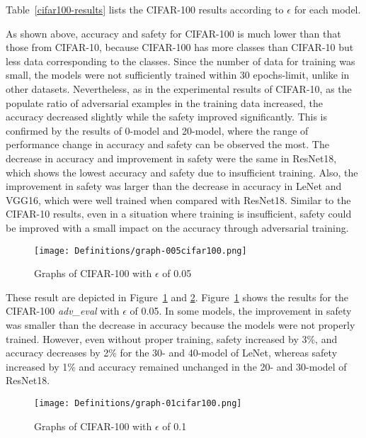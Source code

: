 \documentclass[symmetry,article,submit,moreauthors,pdftex]{Definitions/mdpi}
\begin{document}
Table~\ref{cifar100-results} lists the CIFAR-100 results according to \begin{math}\epsilon\end{math} for each model.

As shown above, accuracy and safety for CIFAR-100 is much lower than that those from CIFAR-10, because CIFAR-100 has more classes than CIFAR-10 but less data corresponding to the classes. Since the number of data for training was small, the models were not sufficiently trained within 30 epochs-limit, unlike in other datasets. 
Nevertheless, as in the experimental results of CIFAR-10, as the populate ratio of adversarial examples in the training data increased, the accuracy decreased slightly while the safety improved significantly.
This is confirmed by the results of 0-model and 20-model, where the range of performance change in accuracy and safety can be observed the most.
The decrease in accuracy and improvement in safety were the same in ResNet18, which shows the lowest accuracy and safety due to insufficient training.
Also, the improvement in safety was larger than the decrease in accuracy in LeNet and VGG16, which were well trained when compared with ResNet18.
Similar to the CIFAR-10 results, even in a situation where training is insufficient, safety could be improved with a small impact on the accuracy through adversarial training.

\begin{figure}[H]
    \texttt{[image: Definitions/graph-005cifar100.png]}
    \caption{Graphs of CIFAR-100 with \begin{math}\epsilon\end{math} of 0.05\label{cifar100-0.05-graph}}
\end{figure} 

These result are depicted in Figure~\ref{cifar100-0.05-graph} and \ref{cifar100-0.1-graph}.
Figure~\ref{cifar100-0.05-graph} shows the results for the CIFAR-100 {\it adv\_eval} with \begin{math}\epsilon\end{math} of 0.05.
In some models, the improvement in safety was smaller than the decrease in accuracy because the models were not properly trained.
However, even without proper training, safety increased by 3\%, and accuracy decreases by 2\% for the 30- and 40-model of LeNet,
whereas safety increased by 1\% and accuracy remained unchanged in the 20- and 30-model of ResNet18.

\begin{figure}[H]
    \texttt{[image: Definitions/graph-01cifar100.png]}
    \caption{Graphs of CIFAR-100 with \begin{math}\epsilon\end{math} of 0.1\label{cifar100-0.1-graph}}
\end{figure} 
\end{document}
